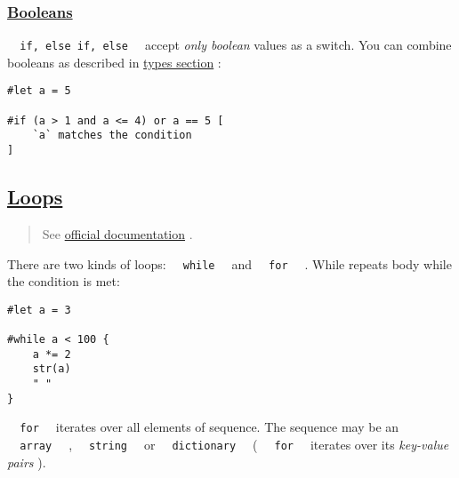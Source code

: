 \pandocbounded{}

\subsubsection{\texorpdfstring{\hyperref[booleans]{Booleans}}{Booleans}}\label{booleans}

\texttt{\ }{\texttt{\ if,\ else\ if,\ else\ }}\texttt{\ } accept
\emph{only boolean} values as a switch. You can combine booleans as
described in \href{./types.html\#boolean-bool}{types section} :

\begin{verbatim}
#let a = 5

#if (a > 1 and a <= 4) or a == 5 [
    `a` matches the condition
]
\end{verbatim}

\pandocbounded{}

\subsection{\texorpdfstring{\hyperref[loops]{Loops}}{Loops}}\label{loops}

\begin{quote}
See \href{https://typst.app/docs/reference/scripting/\#loops}{official
documentation} .
\end{quote}

There are two kinds of loops: \texttt{\ }{\texttt{\ while\ }}\texttt{\ }
and \texttt{\ }{\texttt{\ for\ }}\texttt{\ } . While repeats body while
the condition is met:

\begin{verbatim}
#let a = 3

#while a < 100 {
    a *= 2
    str(a)
    " "
}
\end{verbatim}

\pandocbounded{}

\texttt{\ }{\texttt{\ for\ }}\texttt{\ } iterates over all elements of
sequence. The sequence may be an
\texttt{\ }{\texttt{\ array\ }}\texttt{\ } ,
\texttt{\ }{\texttt{\ string\ }}\texttt{\ } or
\texttt{\ }{\texttt{\ dictionary\ }}\texttt{\ } (
\texttt{\ }{\texttt{\ for\ }}\texttt{\ } iterates over its
\emph{key-value pairs} ).

